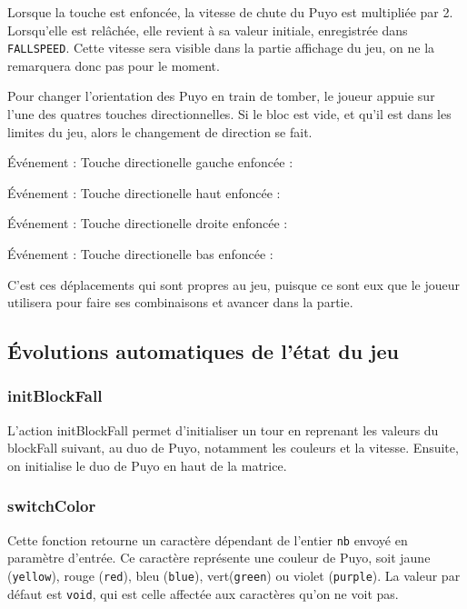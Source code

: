 \documentclass[11pt, final]{report}
\renewcommand{\tt}[1]{\texttt{#1}}
\begin{document}
Lorsque la touche est enfoncée, la vitesse de chute du Puyo est multipliée par 2. Lorsqu'elle est relâchée, elle revient à sa valeur initiale, enregistrée dans \tt{FALLSPEED}. Cette vitesse sera visible dans la partie affichage du jeu, on ne la remarquera donc pas pour le moment.  

Pour changer l'orientation des Puyo en train de tomber, le joueur appuie sur l'une des quatres touches directionnelles. Si le bloc est vide, et qu'il est dans les limites du jeu, alors le changement de direction se fait. 

Événement : Touche directionelle gauche enfoncée : 


Événement : Touche directionelle haut enfoncée : 


Événement : Touche directionelle droite enfoncée :


Événement : Touche directionelle bas enfoncée :


C'est ces déplacements qui sont propres au jeu, puisque ce sont eux que le joueur utilisera pour faire ses combinaisons et avancer dans la partie. 
\pagebreak
\subsection{Évolutions automatiques de l’état du jeu}

\subsubsection{initBlockFall}


L’action initBlockFall permet d’initialiser un tour en reprenant les valeurs du blockFall suivant, au duo de Puyo, notamment les couleurs et la vitesse. Ensuite, on initialise le duo de Puyo en haut de la matrice. 
\\

\subsubsection{switchColor}


Cette fonction retourne un caractère dépendant de l'entier \tt{nb} envoyé en paramètre d'entrée. Ce caractère représente une couleur de Puyo, soit jaune (\tt{yellow}), rouge (\tt{red}), bleu (\tt{blue}), vert(\tt{green}) ou violet (\tt{purple}). La valeur par défaut est \tt{void}, qui est celle affectée aux caractères qu'on ne voit pas. 
\\
\end{document}
